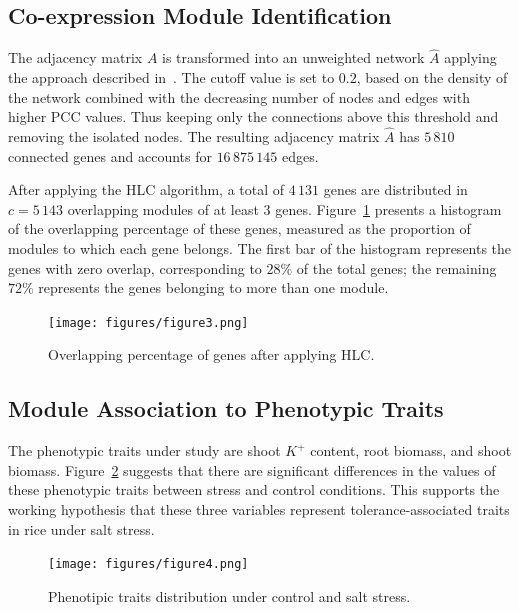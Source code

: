 \documentclass{bmcart}
\begin{document}
\subsection*{Co-expression Module Identification}

The adjacency matrix $A$ is transformed into an unweighted network
$\hat{A}$ applying the approach described
in~\cite{aoki2007approaches}. The cutoff value is set to $0.2$, 
based on the density of the network
combined with the decreasing number of nodes and edges with higher PCC
values. Thus keeping only the
connections above this threshold and removing the isolated nodes. The
resulting adjacency matrix $\hat{A}$ has $5\,810$ connected genes and
accounts for $16\,875\,145$ edges.
\vspace{0.5cm}

After applying the HLC algorithm, a total of $4\,131$ genes are
distributed in $c = 5\,143$ overlapping modules of at least $3$
genes. Figure~\ref{fig:overlap} presents a histogram of the
overlapping percentage of these genes, measured as the proportion of
modules to which each gene belongs. The first bar of the histogram
represents the genes with zero overlap, corresponding to $28\%$ of the
total genes; the remaining $72\%$ represents the genes belonging to
more than one module.

\begin{figure}[htbp]
  \centering
    \texttt{[image: figures/figure3.png]}
  \caption{Overlapping percentage of genes after applying HLC.}
  \label{fig:overlap}
\end{figure}

\subsection*{Module Association to Phenotypic Traits}

The phenotypic traits under study are shoot $K^+$ content, root
biomass, and shoot biomass. Figure~\ref{fig:pdata} suggests that there
are significant differences in the values of these phenotypic traits
between stress and control conditions. This supports the working
hypothesis that these three variables represent tolerance-associated
traits in rice under salt stress.
\vspace{0.5cm}

\begin{figure}[htbp]
  \centering
    \texttt{[image: figures/figure4.png]}
  \caption{Phenotipic traits distribution under control and salt stress.}
  \label{fig:pdata}
\end{figure}
\end{document}
